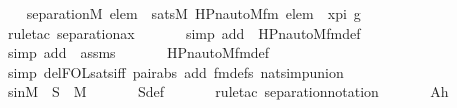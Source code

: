 \begin{isabellebody}
\isanewline
\ \ \isamarkupfalse%
\ {\isachardoublequoteopen}separation{\isacharparenleft}{\kern0pt}{\isacharhash}{\kern0pt}{\isacharhash}{\kern0pt}M{\isacharcomma}{\kern0pt}\ {\isasymlambda}elem\ {\isachardot}{\kern0pt}\ sats{\isacharparenleft}{\kern0pt}M{\isacharcomma}{\kern0pt}\ HPn{\isacharunderscore}{\kern0pt}auto{\isacharunderscore}{\kern0pt}M{\isacharunderscore}{\kern0pt}fm{\isacharcomma}{\kern0pt}\ {\isacharbrackleft}{\kern0pt}elem{\isacharbrackright}{\kern0pt}\ {\isacharat}{\kern0pt}\ {\isacharbrackleft}{\kern0pt}x{\isacharunderscore}{\kern0pt}pi{\isacharcomma}{\kern0pt}\ g{\isacharbrackright}{\kern0pt}{\isacharparenright}{\kern0pt}{\isacharparenright}{\kern0pt}{\isachardoublequoteclose}\ \isanewline
\ \ \ \ \isamarkupfalse%
\ {\isacharparenleft}{\kern0pt}rule{\isacharunderscore}{\kern0pt}tac\ separation{\isacharunderscore}{\kern0pt}ax{\isacharparenright}{\kern0pt}\ \isanewline
\ \ \ \ \isamarkupfalse%
\ {\isacharparenleft}{\kern0pt}simp\ add\ {\isacharcolon}{\kern0pt}\ HPn{\isacharunderscore}{\kern0pt}auto{\isacharunderscore}{\kern0pt}M{\isacharunderscore}{\kern0pt}fm{\isacharunderscore}{\kern0pt}def{\isacharparenright}{\kern0pt}\ \isanewline
\ \ \ \ \isamarkupfalse%
\ {\isacharparenleft}{\kern0pt}simp\ add\ {\isacharcolon}{\kern0pt}\ assms{\isacharparenright}{\kern0pt}\ \isanewline
\ \ \ \ \isamarkupfalse%
\ HPn{\isacharunderscore}{\kern0pt}auto{\isacharunderscore}{\kern0pt}M{\isacharunderscore}{\kern0pt}fm{\isacharunderscore}{\kern0pt}def\ \isanewline
\ \ \ \ \isamarkupfalse%
\ {\isacharparenleft}{\kern0pt}simp\ del{\isacharcolon}{\kern0pt}FOL{\isacharunderscore}{\kern0pt}sats{\isacharunderscore}{\kern0pt}iff\ pair{\isacharunderscore}{\kern0pt}abs\ add{\isacharcolon}{\kern0pt}\ fm{\isacharunderscore}{\kern0pt}defs\ nat{\isacharunderscore}{\kern0pt}simp{\isacharunderscore}{\kern0pt}union{\isacharparenright}{\kern0pt}\ \isanewline
\ \ \ \ \isamarkupfalse%
\ \isanewline
\ \ \isamarkupfalse%
\ \isamarkupfalse%
\ sinM\ {\isacharcolon}{\kern0pt}\ {\isachardoublequoteopen}S\ {\isasymin}\ M{\isachardoublequoteclose}\ \isanewline
\ \ \ \ \isamarkupfalse%
\ S{\isacharunderscore}{\kern0pt}def\ \isanewline
\ \ \ \ \isamarkupfalse%
\ {\isacharparenleft}{\kern0pt}rule{\isacharunderscore}{\kern0pt}tac\ separation{\isacharunderscore}{\kern0pt}notation{\isacharparenright}{\kern0pt}\ \isanewline
\ \ \ \ \isamarkupfalse%
\ Ah\ \isanewline
\ \ \ \ \isamarkupfalse%

\end{isabellebody}
